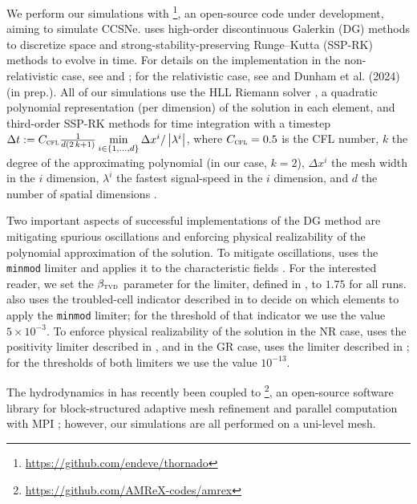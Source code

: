 We perform our simulations with \thornado{}%
\footnote{\url{https://github.com/endeve/thornado}},
an open-source code under development,
aiming to simulate CCSNe.
\thornado{} uses high-order discontinuous Galerkin (DG) methods
to discretize space and strong-stability-preserving Runge--Kutta
(SSP-RK) methods to evolve in time.
For details on the implementation in the non-relativistic case,
see \citet{ebd2019} and \citet{pbe2021};
for the relativistic case, see \citet{dem2020} and
Dunham et al. (2024) (in prep.).
All of our simulations use the HLL Riemann solver \citep{hll1983},
a quadratic polynomial representation (per dimension) of the
solution in each element, and
third-order SSP-RK methods for time integration \citep{gst2001}
with a timestep
$\Delta t
:=C_{\textsc{cfl}}
\frac{1}{d\left(2\,k+1\right)}
\min\limits_{i\in\left\{1,\ldots,d\right\}}
\Delta x^{i}/\left|\lambda^{i}\right|$,
where $C_{\textsc{cfl}}=0.5$ is the CFL number,
$k$ the degree of the approximating polynomial (in our case, $k=2$),
$\Delta x^{i}$ the mesh width in the $i$\th{} dimension,
$\lambda^{i}$ the fastest signal-speed in the $i$\th{} dimension,
and $d$ the number of spatial dimensions \citep{cs2001}.

Two important aspects of successful implementations of
the DG method are mitigating spurious
oscillations and enforcing physical realizability
of the polynomial approximation of the solution.
To mitigate oscillations, \thornado{} uses the \texttt{minmod}
limiter and applies it to the characteristic fields
\citep[see, e.g.,][]{s1987,pbe2021}.
For the interested reader, we set the $\beta_{\textsc{tvd}}$ parameter
for the limiter, defined in \citet{pbe2021}, to $1.75$ for all runs.
\thornado{} also uses the troubled-cell indicator described
in \cite{fs2017} to decide on which
elements to apply the \texttt{minmod} limiter;
for the threshold of that indicator
we use the value $5\times10^{-3}$.
To enforce physical realizability of the solution in the NR case,
\thornado{} uses the positivity limiter described in \citet{zs2010},
and in the GR case, uses the limiter described in \citet{qsy2016};
for the thresholds of both limiters we use the value $10^{-13}$.

The hydrodynamics in \thornado{} has recently been coupled to
\amrex{}\footnote{\url{https://github.com/AMReX-codes/amrex}},
an open-source software library for block-structured adaptive
mesh refinement and parallel computation with MPI \citep{zab2019};
however, our simulations are all performed on a uni-level mesh.

